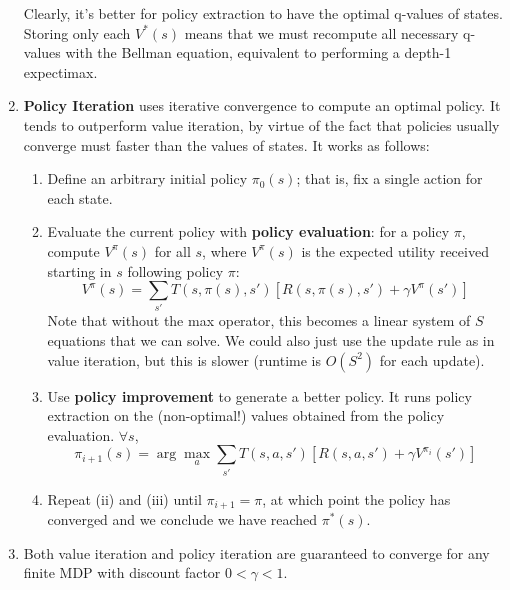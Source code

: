 \documentclass[10pt]{article}
\begin{document}
\begin{multicols}{2}
\begin{addmargin}[0.8em]{0.5em}
\begin{enumerate}[label=(\alph*)]
            Clearly, it’s better for policy extraction to have the optimal q-values of states. Storing only each $V^*(s)$ means that we must recompute all necessary q-values with the Bellman equation, equivalent to performing a depth-1 expectimax.
            \item \textbf{Policy Iteration} uses iterative convergence to compute an optimal policy. It tends to outperform value iteration, by virtue of the fact that policies usually converge must faster than the values of states. It works as follows:
            \begin{enumerate}[label=\roman*.]
                \item Define an arbitrary initial policy $\pi_0(s)$; that is, fix a single action for each state.
                \item Evaluate the current policy with \textbf{policy evaluation}: for a policy $\pi$, compute $V^\pi(s)$ for all $s$, where $V^\pi(s)$ is the expected utility received starting in $s$ following policy $\pi$: $$V^\pi(s)=\sum_{s'} T(s,\pi(s),s') [R(s,\pi(s),s')+\gamma V^\pi(s')]$$
                Note that without the max operator, this becomes a linear system of $S$ equations that we can solve. We could also just use the update rule as in value iteration, but this is slower (runtime is $O(S^2)$ for each update).
                \item Use \textbf{policy improvement} to generate a better policy. It runs policy extraction on the (non-optimal!) values obtained from the policy evaluation. $\forall s$,
                $$\pi_{i+1}(s)=\arg\max_{a} \sum_{s'} T(s,a,s') [R(s,a,s')+\gamma V^{\pi_i}(s')]$$
                \item Repeat (ii) and (iii) until $\pi_{i+1}=\pi$, at which point the policy has converged and we conclude we have reached $\pi^*(s)$.
            \end{enumerate}
        \item Both value iteration and policy iteration are guaranteed to converge for any finite MDP with discount factor $0 < \gamma < 1$.
    \end{enumerate}
    

\end{addmargin}
\end{multicols}
\end{document}
